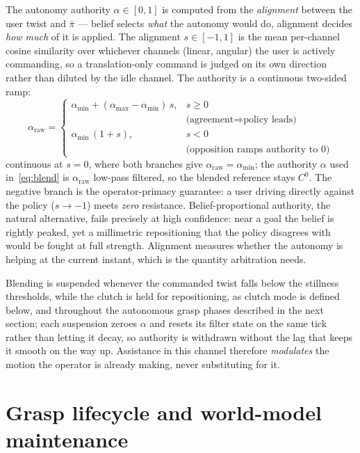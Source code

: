 The autonomy authority $\alpha \in [0,1]$ is computed from the \emph{alignment} between the user twist and $\bar{\pi}$ --- belief selects \emph{what} the autonomy would do, alignment decides \emph{how much} of it is applied. The alignment $s \in [-1,1]$ is the mean per-channel cosine similarity over whichever channels (linear, angular) the user is actively commanding, so a translation-only command is judged on its own direction rather than diluted by the idle channel. The authority is a continuous two-sided ramp:
\begin{equation}
\alpha_{\text{raw}} =
\begin{cases}
\alpha_{\min} + (\alpha_{\max} - \alpha_{\min})\, s, & s \ge 0 \\
& \text{(agreement} \Rightarrow \text{policy leads)}\\[2pt]
\alpha_{\min}\,(1 + s), & s < 0 \\
& \text{(opposition ramps authority to } 0\text{)}
\end{cases}
\label{eq:alpha}
\end{equation}
continuous at $s{=}0$, where both branches give $\alpha_{\text{raw}} = \alpha_{\min}$; the authority $\alpha$ used in~\eqref{eq:blend} is $\alpha_{\text{raw}}$ low-pass filtered, so the blended reference stays $C^0$. The negative branch is the operator-primacy guarantee: a user driving directly against the policy ($s \to -1$) meets \emph{zero} resistance. Belief-proportional authority, the natural alternative, fails precisely at high confidence: near a goal the belief is rightly peaked, yet a millimetric repositioning that the policy disagrees with would be fought at full strength. Alignment measures whether the autonomy is helping at the current instant, which is the quantity arbitration needs.

Blending is suspended whenever the commanded twist falls below the stillness thresholds, while the clutch is held for repositioning, as clutch mode is defined below, and throughout the autonomous grasp phases described in the next section; each suspension zeroes $\alpha$ and resets its filter state on the same tick rather than letting it decay, so authority is withdrawn without the lag that keeps it smooth on the way up. Assistance in this channel therefore \emph{modulates} the motion the operator is already making, never substituting for it.

\section{Grasp lifecycle and world-model maintenance}
\label{sec:grasp}

